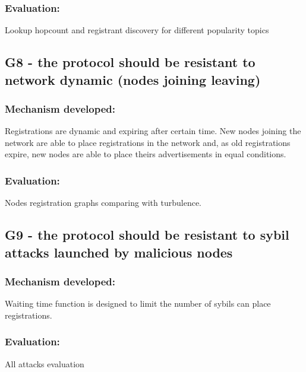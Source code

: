 \subsubsection{Evaluation: }

Lookup hopcount and registrant discovery 
for different popularity topics

\subsection{G8 - the protocol should be resistant to network dynamic (nodes joining leaving)}

\subsubsection{Mechanism developed:} 

Registrations are dynamic and expiring after certain time. 
New nodes joining the network are able to place registrations in the network and, as old registrations expire,  new nodes are able to place theirs advertisements in equal conditions.

\subsubsection{Evaluation: }

Nodes registration graphs comparing with turbulence.

\subsection{G9 - the protocol should be resistant to sybil attacks launched by malicious nodes}

\subsubsection{Mechanism developed:} 

Waiting time function is designed to limit the number of sybils can place registrations.

\subsubsection{Evaluation: }

All attacks evaluation

